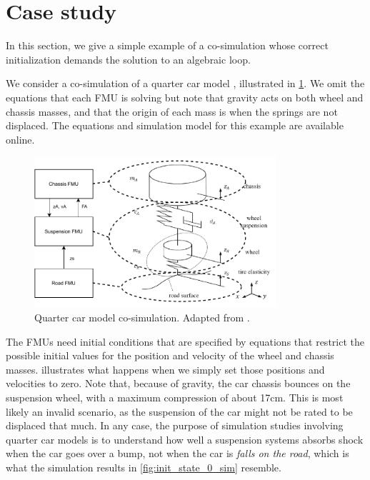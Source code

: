 \section{Case study}
\label{sec:case_study}
In this section, we give a simple example of a co-simulation whose correct initialization demands the solution to an algebraic loop.

We consider a co-simulation of a quarter car model \cite[Section 6.4]{Schramm2014}, illustrated in \cref{fig:quarter_car}.
We omit the equations that each FMU is solving but note that gravity acts on both wheel and chassis masses, and that the origin of each mass is when the springs are not displaced.
The equations and simulation model for this example are available online. 

\begin{figure}[htb]
    \centering
    \includegraphics[width=0.8\textwidth]{images/quarter_car.pdf}
    \caption{Quarter car model co-simulation. Adapted from \cite[Section 6.4]{Schramm2014}. }
    \label{fig:quarter_car}
\end{figure}

The FMUs need initial conditions that are specified by equations that restrict the possible initial values for the position and velocity of the wheel and chassis masses.
 illustrates what happens when we simply set those positions and velocities to zero.
Note that, because of gravity, the car chassis bounces on the suspension wheel, with a maximum compression of about 17cm. This is most likely an invalid scenario, as the suspension of the car might not be rated to be displaced that much. In any case, the purpose of simulation studies involving quarter car models is to understand how well a suspension systems absorbs shock when the car goes over a bump, not when the car is \emph{falls on the road}, which is what the simulation results in \cref{fig:init_state_0_sim} resemble.

